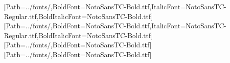 \providecommand{\codexfontpath}{../fonts/}
\setmainfont{NotoSansTC-Regular.ttf}[Path=\codexfontpath,BoldFont=NotoSansTC-Bold.ttf,ItalicFont=NotoSansTC-Regular.ttf,BoldItalicFont=NotoSansTC-Bold.ttf]
[Path=\codexfontpath,BoldFont=NotoSansTC-Bold.ttf,ItalicFont=NotoSansTC-Regular.ttf,BoldItalicFont=NotoSansTC-Bold.ttf]
\setmonofont{NotoSansTC-Regular.ttf}[Path=\codexfontpath,BoldFont=NotoSansTC-Bold.ttf]
[Path=\codexfontpath,BoldFont=NotoSansTC-Bold.ttf]

